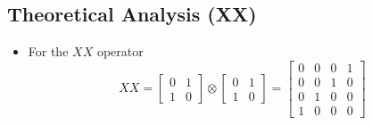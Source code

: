 \documentclass{article}
\begin{document}
\subsection{Theoretical Analysis (XX)}
\begin{itemize}
	\item For the \(XX\) operator
	      \begin{equation*}
		      XX =
		      \begin{bmatrix}
			      0 & 1 \\
			      1 & 0
		      \end{bmatrix}
		      \otimes
		      \begin{bmatrix}
			      0 & 1 \\
			      1 & 0
		      \end{bmatrix}
		      = \begin{bmatrix}
			      0 & 0 & 0 & 1 \\
			      0 & 0 & 1 & 0 \\
			      0 & 1 & 0 & 0 \\
			      1 & 0 & 0 & 0
		      \end{bmatrix}
	      \end{equation*}


\end{itemize}
\end{document}
